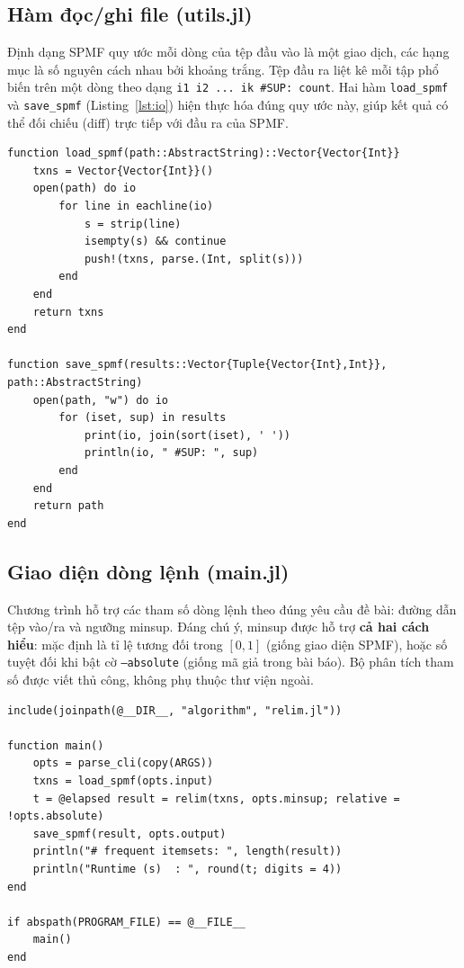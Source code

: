 \documentclass[12pt,a4paper]{report}
\begin{document}
\subsection{Hàm đọc/ghi file (utils.jl)}

Định dạng SPMF quy ước mỗi dòng của tệp đầu vào là một giao dịch, các hạng mục
là số nguyên cách nhau bởi khoảng trắng. Tệp đầu ra liệt kê mỗi tập phổ biến
trên một dòng theo dạng \texttt{i1 i2 ... ik \#SUP: count}. Hai hàm
\texttt{load\_spmf} và \texttt{save\_spmf} (Listing~\ref{lst:io}) hiện thực hóa
đúng quy ước này, giúp kết quả có thể đối chiếu (diff) trực tiếp với đầu ra của
SPMF.

\begin{lstlisting}[style=julia, caption={Đọc/ghi định dạng SPMF (utils.jl)},
                   label={lst:io}]
function load_spmf(path::AbstractString)::Vector{Vector{Int}}
    txns = Vector{Vector{Int}}()
    open(path) do io
        for line in eachline(io)
            s = strip(line)
            isempty(s) && continue
            push!(txns, parse.(Int, split(s)))
        end
    end
    return txns
end

function save_spmf(results::Vector{Tuple{Vector{Int},Int}}, path::AbstractString)
    open(path, "w") do io
        for (iset, sup) in results
            print(io, join(sort(iset), ' '))
            println(io, " #SUP: ", sup)
        end
    end
    return path
end
\end{lstlisting}

\subsection{Giao diện dòng lệnh (main.jl)}

Chương trình hỗ trợ các tham số dòng lệnh theo đúng yêu cầu đề bài: đường dẫn
tệp vào/ra và ngưỡng minsup. Đáng chú ý, minsup được hỗ trợ \textbf{cả hai cách
hiểu}: mặc định là tỉ lệ tương đối trong $[0,1]$ (giống giao diện SPMF), hoặc số
tuyệt đối khi bật cờ \texttt{--absolute} (giống mã giả trong bài báo). Bộ phân
tích tham số được viết thủ công, không phụ thuộc thư viện ngoài.

\begin{lstlisting}[style=julia, caption={Điểm vào chương trình (main.jl)},
                   label={lst:main}]
include(joinpath(@__DIR__, "algorithm", "relim.jl"))

function main()
    opts = parse_cli(copy(ARGS))
    txns = load_spmf(opts.input)
    t = @elapsed result = relim(txns, opts.minsup; relative = !opts.absolute)
    save_spmf(result, opts.output)
    println("# frequent itemsets: ", length(result))
    println("Runtime (s)  : ", round(t; digits = 4))
end

if abspath(PROGRAM_FILE) == @__FILE__
    main()
end
\end{lstlisting}
\end{document}
